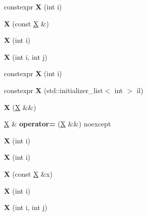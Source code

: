 \begin{DoxyCompactItemize}
constexpr {\bfseries X} (int i)
\item 
\mbox{\label{class_x_a02ee09775690a43c8afadcf4b1f80530}} 
{\bfseries X} (const \mbox{\hyperlink{class_x}{X}} \&)
\item 
\mbox{\label{class_x_ab821891e399ee066c77b3234b63f128f}} 
{\bfseries X} (int i)
\item 
\mbox{\label{class_x_a4caaa01cb52b2e3045565ae9f4320ebb}} 
{\bfseries X} (int i, int j)
\item 
\mbox{\label{class_x_acb10a534a7ab0dafa80c9ff2401e41bf}} 
constexpr {\bfseries X} (int i)
\item 
\mbox{\label{class_x_a59ccd6990791e60f6f4e0d4075ca21c3}} 
constexpr {\bfseries X} (std\+::initializer\+\_\+list$<$ int $>$ il)
\item 
\mbox{\label{class_x_a4aee738a743f3db8533ccc106b68e7d8}} 
{\bfseries X} (\mbox{\hyperlink{class_x}{X}} \&\&)
\item 
\mbox{\label{class_x_a19ad9bf005565d0c79b30cf4a90289a0}} 
\mbox{\hyperlink{class_x}{X}} \& {\bfseries operator=} (\mbox{\hyperlink{class_x}{X}} \&\&) noexcept
\item 
\mbox{\label{class_x_ab821891e399ee066c77b3234b63f128f}} 
{\bfseries X} (int i)
\item 
\mbox{\label{class_x_ab821891e399ee066c77b3234b63f128f}} 
{\bfseries X} (int i)
\item 
\mbox{\label{class_x_a21e9c5a8bee6a88fc4726ff66ce202ae}} 
{\bfseries X} (const \mbox{\hyperlink{class_x}{X}} \&x)
\item 
\mbox{\label{class_x_ab821891e399ee066c77b3234b63f128f}} 
{\bfseries X} (int i)
\item 
\mbox{\label{class_x_a4caaa01cb52b2e3045565ae9f4320ebb}} 
{\bfseries X} (int i, int j)
\item 
\mbox{\label{class_x_ab821891e399ee066c77b3234b63f128f}} 

\end{DoxyCompactItemize}
